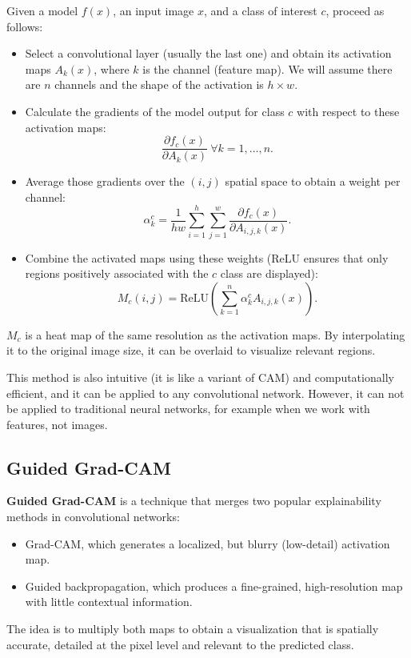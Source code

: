 Given a model $f(x)$, an input image $x$, and a class of interest $c$, proceed as follows:
\begin{itemize}
\item Select a convolutional layer (usually the last one) and obtain its activation maps $A_k(x)$, where $k$ is the channel (feature map). We will assume there are $n$ channels and the shape of the activation is $h\times w$.
\item Calculate the gradients of the model output for class $c$ with respect to these activation maps:
$$\dfrac{\partial f_c(x)}{\partial A_k(x)} ~ \forall k = 1, \ldots, n.$$
\item Average those gradients over the $(i, j)$ spatial space to obtain a weight per channel:
$$\alpha_k^c = \dfrac{1}{hw}\sum_{i=1}^h\sum_{j=1}^w\dfrac{\partial f_c(x)}{\partial A_{i, j, k}(x)}.$$
\item Combine the activated maps using these weights (ReLU ensures that only regions positively associated with the $c$ class are displayed):
$$M_c(i, j) = \text{ReLU}\left(\sum_{k=1}^n\alpha_k^cA_{i, j, k}(x)\right).$$
\end{itemize}
$M_c$ is a heat map of the same resolution as the activation maps. By interpolating it to the original image size, it can be overlaid to visualize relevant regions.

This method is also intuitive (it is like a variant of CAM) and computationally efficient, and it can be applied to any convolutional network. However, it can not be applied to traditional neural networks, for example when we work with features, not images.

\subsection{Guided Grad-CAM}

\textbf{Guided Grad-CAM} is a technique that merges two popular explainability methods in convolutional networks:
\begin{itemize}
\item Grad-CAM, which generates a localized, but blurry (low-detail) activation map.
\item Guided backpropagation, which produces a fine-grained, high-resolution map with little contextual information.
\end{itemize}
The idea is to multiply both maps to obtain a visualization that is spatially accurate, detailed at the pixel level and relevant to the predicted class.

